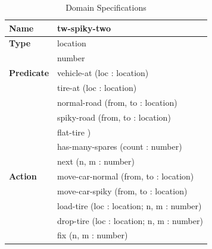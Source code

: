 \begin{table}[ht]
\centering
\begin{tabular}{ll}
\hline
\textbf{Name} & \textbf{tw-spiky-two}\\
\hline
\textbf{Type} & \textcolor{type_color}{location}\\
\textbf{} & \textcolor{type_color}{number}\\
\hline
\textbf{Predicate} & \textcolor{predicate_color}{vehicle-at } (\textcolor{variable_color}{loc } : \textcolor{type_color}{ location})\\
\textbf{} & \textcolor{predicate_color}{tire-at } (\textcolor{variable_color}{loc } : \textcolor{type_color}{ location})\\
\textbf{} & \textcolor{predicate_color}{normal-road } (\textcolor{variable_color}{from}, \textcolor{variable_color}{ to } : \textcolor{type_color}{ location})\\
\textbf{} & \textcolor{predicate_color}{spiky-road } (\textcolor{variable_color}{from}, \textcolor{variable_color}{ to } : \textcolor{type_color}{ location})\\
\textbf{} & \textcolor{predicate_color}{flat-tire })\\
\textbf{} & \textcolor{predicate_color}{has-many-spares } (\textcolor{variable_color}{count } : \textcolor{type_color}{ number})\\
\textbf{} & \textcolor{predicate_color}{next } (\textcolor{variable_color}{n}, \textcolor{variable_color}{ m } : \textcolor{type_color}{ number})\\
\hline
\textbf{Action} & \textcolor{action_color}{move-car-normal } (\textcolor{variable_color}{from}, \textcolor{variable_color}{ to } : \textcolor{type_color}{ location})\\
\textbf{} & \textcolor{action_color}{move-car-spiky } (\textcolor{variable_color}{from}, \textcolor{variable_color}{ to } : \textcolor{type_color}{ location})\\
\textbf{} & \textcolor{action_color}{load-tire } (\textcolor{variable_color}{loc } : \textcolor{type_color}{ location}; \textcolor{variable_color}{ n}, \textcolor{variable_color}{ m } : \textcolor{type_color}{ number})\\
\textbf{} & \textcolor{action_color}{drop-tire } (\textcolor{variable_color}{loc } : \textcolor{type_color}{ location}; \textcolor{variable_color}{ n}, \textcolor{variable_color}{ m } : \textcolor{type_color}{ number})\\
\textbf{} & \textcolor{action_color}{fix } (\textcolor{variable_color}{n}, \textcolor{variable_color}{ m } : \textcolor{type_color}{ number})\\
\hline
\end{tabular}
\caption{Domain Specifications}
\label{tab:domain_specifications}
\end{table}
